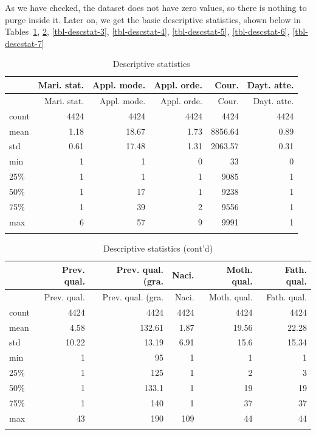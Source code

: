 \documentclass[
  letterpaper,
  DIV=11,
  numbers=noendperiod]{scrartcl}
\begin{document}
As we have checked, the dataset does not have zero values, so there is
nothing to purge inside it. Later on, we get the basic descriptive
statistics, shown below in\\
Tables~\ref{tbl-descstat-1}, \ref{tbl-descstat-2}, \ref{tbl-descstat-3}, \ref{tbl-descstat-4}, \ref{tbl-descstat-5}, \ref{tbl-descstat-6}, \ref{tbl-descstat-7}

\hypertarget{tbl-descstat-1}{}
\begin{longtable}[]{@{}lrrrrr@{}}
\toprule\noalign{}
& Mari. stat. & Appl. mode. & Appl. orde. & Cour. & Dayt. atte. \\
\midrule\noalign{}
\endfirsthead
\toprule\noalign{}
& Mari. stat. & Appl. mode. & Appl. orde. & Cour. & Dayt. atte. \\
\midrule\noalign{}
\endhead
\bottomrule\noalign{}
\endlastfoot
count & 4424 & 4424 & 4424 & 4424 & 4424 \\
mean & 1.18 & 18.67 & 1.73 & 8856.64 & 0.89 \\
std & 0.61 & 17.48 & 1.31 & 2063.57 & 0.31 \\
min & 1 & 1 & 0 & 33 & 0 \\
25\% & 1 & 1 & 1 & 9085 & 1 \\
50\% & 1 & 17 & 1 & 9238 & 1 \\
75\% & 1 & 39 & 2 & 9556 & 1 \\
max & 6 & 57 & 9 & 9991 & 1 \\
\caption{\label{tbl-descstat-1}Descriptive statistics}\tabularnewline
\end{longtable}

\hypertarget{tbl-descstat-2}{}
\begin{longtable}[]{@{}lrrrrr@{}}
\toprule\noalign{}
& Prev. qual. & Prev. qual. (gra. & Naci. & Moth. qual. & Fath. qual. \\
\midrule\noalign{}
\endfirsthead
\toprule\noalign{}
& Prev. qual. & Prev. qual. (gra. & Naci. & Moth. qual. & Fath. qual. \\
\midrule\noalign{}
\endhead
\bottomrule\noalign{}
\endlastfoot
count & 4424 & 4424 & 4424 & 4424 & 4424 \\
mean & 4.58 & 132.61 & 1.87 & 19.56 & 22.28 \\
std & 10.22 & 13.19 & 6.91 & 15.6 & 15.34 \\
min & 1 & 95 & 1 & 1 & 1 \\
25\% & 1 & 125 & 1 & 2 & 3 \\
50\% & 1 & 133.1 & 1 & 19 & 19 \\
75\% & 1 & 140 & 1 & 37 & 37 \\
max & 43 & 190 & 109 & 44 & 44 \\
\caption{\label{tbl-descstat-2}Descriptive statistics
(cont'd)}\tabularnewline
\end{longtable}
\end{document}
